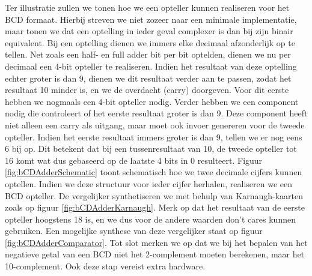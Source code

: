 Ter illustratie zullen we tonen hoe we een opteller kunnen realiseren voor het BCD formaat. Hierbij streven we niet zozeer naar een minimale implementatie, maar tonen we dat een optelling in ieder geval complexer is dan bij zijn binair equivalent. Bij een optelling dienen we immers elke decimaal afzonderlijk op te tellen. Net zoals een half- en full adder bit per bit optelden, dienen we nu per decimaal een 4-bit opteller te realiseren. Indien het resultaat van deze optelling echter groter is dan 9, dienen we dit resultaat verder aan te passen, zodat het resultaat 10 minder is, en we de overdacht (carry) doorgeven. Voor dit eerste hebben we nogmaals een 4-bit opteller nodig. Verder hebben we een component nodig die controleert of het eerste resultaat groter is dan 9. Deze component heeft niet alleen een carry als uitgang, maar moet ook invoer genereren voor de tweede opteller. Indien het eerste resultaat immers groter is dan 9, tellen we er nog eens 6 bij op. Dit betekent dat bij een tussenresultaat van 10, de tweede opteller tot 16 komt wat dus gebaseerd op de laatste 4 bits in 0 resulteert. Figuur \ref{fig:bCDAdderSchematic} toont schematisch hoe we twee decimale cijfers kunnen optellen. Indien we deze structuur voor ieder cijfer herhalen, realiseren we een BCD opteller. De vergelijker synthetiseren we met behulp van Karnaugh-kaarten zoals op figuur \ref{fig:bCDAdderKarnaugh}. Merk op dat het resultaat van de eerste opteller hoogstens 18 is, en we dus voor de andere waarden don't cares kunnen gebruiken. Een mogelijke synthese van deze vergelijker staat op figuur \ref{fig:bCDAdderComparator}. Tot slot merken we op dat we bij het bepalen van het negatieve getal van een BCD niet het 2-complement moeten berekenen, maar het 10-complement. Ook deze stap vereist extra hardware.
